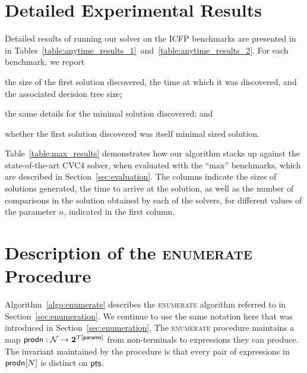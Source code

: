 \newpage
\renewcommand{\thesection}{\appendixname~\Alph{section}}
\begin{appendices}
\section{Detailed Experimental Results}
\label{section:appendix_experimental_results}




Detailed results of running our solver on the ICFP benchmarks are
presented in in
Tables~\ref{table:anytime_results_1}~and~\ref{table:anytime_results_2}. For
each benchmark,
we report
\begin{inparaenum}[(a)]
\item the size of the first solution discovered, the time at which it
was discovered, and the associated decision tree size;
\item the same details for the minimal solution discovered; and
\item whether the first solution discovered was itself minimal sized
  solution.
\end{inparaenum}

Table~\ref{table:max_results} demonstrates how our algorithm stacks up
against the state-of-the-art CVC4 solver, when evaluated with the
``max'' benchmarks, which are described in Section~\ref{sec:evaluation}.
The columns indicate the sizes of solutions generated, the time to arrive
at the solution, as well as the number of comparisons in the solution
obtained by each of the solvers, for different values of the parameter
$n$, indicated in the first column.

\section{Description of the {\scshape{enumerate}} Procedure}
\label{section:appendix_esolver}
Algorithm~\ref{algo:enumerate} describes the \textsc{enumerate}
algorithm referred to in Section~\ref{sec:enumeration}. We continue to
use the same notation here that was introduced in Section~\ref{sec:enumeration}.
The \textsc{enumerate} procedure maintains a map $\mathsf{prodn} : \mathcal{N} \to
\mathbf{2}^{\mathcal{T}[\mathsf{params}]}$ from non-terminals to
expressions they can produce.
The invariant maintained by the procedure is that every pair of
expressions in $\mathsf{prodn}[N]$ is distinct on $\mathsf{pts}$.


\end{appendices}

